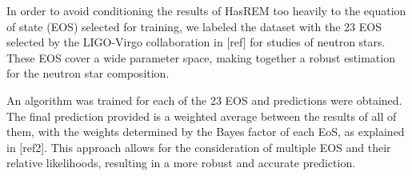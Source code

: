 In order to avoid conditioning the results of HasREM too heavily to the equation of state (EOS) selected for training, we labeled the dataset with the 23 EOS selected by the LIGO-Virgo collaboration in [ref] for studies of neutron stars. These EOS cover a wide parameter space, making together a robust estimation for the neutron star composition.

An algorithm was trained for each of the 23 EOS and predictions were obtained. The final prediction provided is a weighted average between the results of all of them, with the weights determined by the Bayes factor of each EoS, as explained in [ref2]. This approach allows for the consideration of multiple EOS and their relative likelihoods, resulting in a more robust and accurate prediction.

